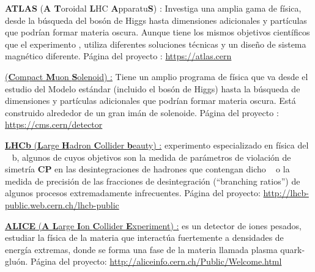 \begin{itemize_f}
\item \textbf{ATLAS} (\textbf{A T}oroidal \textbf{L}HC \textbf{A}pparatu\textbf{S}) : Investiga una amplia gama de física, desde la búsqueda del bosón de Higgs hasta dimensiones adicionales y partículas que podrían formar materia oscura. Aunque tiene los mismos objetivos científicos que el experimento \CMS, utiliza diferentes soluciones técnicas y un diseño de sistema magnético diferente. Página del proyecto : \href{https://atlas.cern}{https://\-atlas\-.\-cern}%

\item \CMS \href{https://en.wikipedia.org/wiki/Compact_Muon_Solenoid}{(\textbf{C}ompact \textbf{M}uon \textbf{S}olenoid) :} Tiene un amplio programa de física que va desde el estudio del Modelo estándar (incluido el bosón de Higgs) hasta la búsqueda de dimensiones y partículas adicionales que podrían formar materia oscura. Está construido alrededor de un gran imán de solenoide. Página del proyecto : \href{https://cms.cern/detector}{https://\-cms.\-cern/\-de\-tec\-tor}%

\item \href{https://es.wikipedia.org/wiki/LHCb}{\textbf{LHCb} (\textbf{L}arge \textbf{H}adron \textbf{C}ollider \textbf{b}eauty) :} experimento especializado en física del \quark ~ b, algunos de cuyos objetivos son la medida de parámetros de violación de simetría \textbf{CP} en las desintegraciones de hadrones que contengan dicho \quark ~ o la medida de precisión de las fracciones de desintegración (``branching ratios'') de algunos procesos extremadamente infrecuentes. Página del proyecto: \href{http://lhcb-public.web.cern.ch/lhcb-public}{http://lhcb-\-public.\-web.\-cern.\-ch/\-lhcb-\-public}

\item \href{https://en.wikipedia.org/wiki/ALICE_experiment}{\textbf{ALICE} (\textbf{A L}arge \textbf{I}on \textbf{C}ollider \textbf{E}xperiment) :} es un detector de iones pesados, estudiar la física de la materia que interactúa fuertemente a densidades de energía extremas, donde se forma una fase de la materia llamada plasma quark-gluón. Página del proyecto: \href{http://aliceinfo.cern.ch/Public/Welcome.html}{http://aliceinfo\-.cern\-.ch/\-Public/\-Welcome\-.html}


\end{itemize_f}

